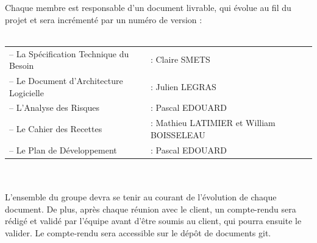 \documentclass[a4paper,11pt,french]{article}
\begin{document}
Chaque membre est responsable d'un document livrable, qui évolue au fil du projet et sera incrémenté par un numéro de version :\\ \\
\begin{tabular}{ll}
–	La Spécification Technique du Besoin 	& : Claire SMETS\\
–	Le Document d'Architecture Logicielle 	& : Julien LEGRAS\\
–	L'Analyse des Risques 					& : Pascal EDOUARD\\
–	Le Cahier des Recettes 					& : Mathieu LATIMIER et William BOISSELEAU\\
–	Le Plan de Développement 				& : Pascal EDOUARD\\
\end{tabular}
\\ \\

L'ensemble du groupe devra se tenir au courant de l'évolution de chaque document. De plus, après chaque réunion avec le client, un compte-rendu sera rédigé et validé par l'équipe avant d'être soumis au client, qui pourra ensuite le valider. Le compte-rendu sera accessible sur le dépôt de documents git.
\end{document}
